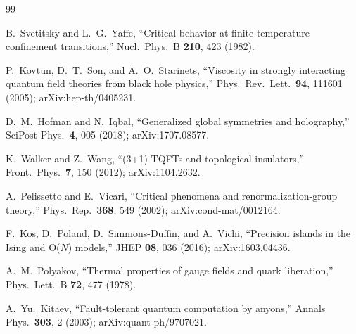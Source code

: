 \documentclass[twocolumn]{revtex4-2}
\begin{document}
\begin{thebibliography}{99}

B.~Svetitsky and L.~G.~Yaffe,
``Critical behavior at finite-temperature confinement transitions,''
Nucl.\ Phys.\ B \textbf{210}, 423 (1982).

P.~Kovtun, D.~T.~Son, and A.~O.~Starinets,
``Viscosity in strongly interacting quantum field theories from black
hole physics,''
Phys.\ Rev.\ Lett.\ \textbf{94}, 111601 (2005); arXiv:hep-th/0405231.

D.~M.~Hofman and N.~Iqbal,
``Generalized global symmetries and holography,''
SciPost Phys.\ \textbf{4}, 005 (2018); arXiv:1707.08577.

K.~Walker and Z.~Wang,
``(3+1)-TQFTs and topological insulators,''
Front.\ Phys.\ \textbf{7}, 150 (2012); arXiv:1104.2632.

A.~Pelissetto and E.~Vicari,
``Critical phenomena and renormalization-group theory,''
Phys.\ Rep.\ \textbf{368}, 549 (2002); arXiv:cond-mat/0012164.

F.~Kos, D.~Poland, D.~Simmons-Duffin, and A.~Vichi,
``Precision islands in the Ising and O($N$) models,''
JHEP \textbf{08}, 036 (2016); arXiv:1603.04436.

A.~M.~Polyakov,
``Thermal properties of gauge fields and quark liberation,''
Phys.\ Lett.\ B \textbf{72}, 477 (1978).

A.~Yu.~Kitaev,
``Fault-tolerant quantum computation by anyons,''
Annals Phys.\ \textbf{303}, 2 (2003); arXiv:quant-ph/9707021.

\end{thebibliography}
\end{document}
